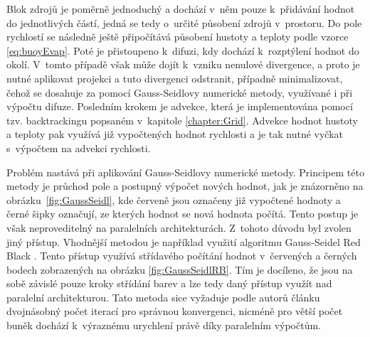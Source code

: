 Blok zdrojů je poměrně jednoduchý a dochází v~něm pouze k~přidávání hodnot do jednotlivých částí, jedná se tedy o~určité působení zdrojů v~prostoru. Do pole rychlostí se následně ještě připočítává působení hustoty a teploty podle vzorce \ref{eq:buoyEvap}. Poté je přistoupeno k~difuzi, kdy dochází k~rozptýlení hodnot do okolí. V~tomto případě však může dojít k~vzniku nenulové divergence, a proto je nutné aplikovat projekci a tuto divergenci odstranit, případně minimalizovat, čehož se dosahuje za pomocí Gauss-Seidlovy numerické metody, využívané i při výpočtu difuze. Posledním krokem je advekce, která je implementována pomocí tzv. backtrackingu popsaném v~kapitole \ref{chapter:Grid}. Advekce hodnot hustoty a teploty pak využívá již vypočtených hodnot rychlosti a je tak nutné vyčkat s~výpočtem na advekci rychlosti.

Problém nastává při aplikování Gauss-Seidlovy numerické metody. Principem této metody je průchod pole a postupný výpočet nových hodnot, jak je znázorněno na obrázku~\ref{fig:GaussSeidl}, kde červeně jsou označeny již vypočtené hodnoty a černé šipky označují, ze kterých hodnot se nová hodnota počítá. Tento postup je však neproveditelný na paralelních architekturách. Z~tohoto důvodu byl zvolen jiný přístup. Vhodnější metodou je například využití algoritmu Gauss-Seidel Red Black \cite{Amador2012LinearSF}. Tento přístup využívá střídavého počítání hodnot v~červených a černých bodech zobrazených na obrázku \ref{fig:GaussSeidlRB}. Tím je docíleno, že jsou na sobě závislé pouze kroky střídání barev a lze tedy daný přístup využít nad paralelní architekturou. Tato metoda sice vyžaduje podle autorů článku \cite{Amador2012LinearSF} dvojnásobný počet iterací pro správnou konvergenci, nicméně pro větší počet buněk dochází k~výraznému urychlení právě díky paralelním výpočtům.

